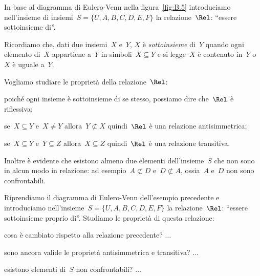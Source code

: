 \begin{exrig}
 \begin{esempio}

In base al diagramma di Eulero-Venn nella figura~\ref{fig:B.5} introduciamo 
nell'insieme di insiemi~$S = \lbrace U, A, B, C, D, E, F \rbrace$ la 
relazione~$\Rel$: ``essere sottoinsieme di''.

Ricordiamo che, dati due insiemi~$X$ e~$Y$, $X$ è \emph{sottoinsieme} di~$Y$ 
quando ogni elemento di~$X$ appartiene a~$Y$ in simboli~$X \subseteq Y$ e
si legge~$X$ è contenuto in~$Y$ o~$X$ è uguale a~$Y$.

Vogliamo studiare le proprietà della relazione~$\Rel$:

\begin{enumeratea}
\item poiché ogni insieme è sottoinsieme di se stesso, possiamo dire che~$\Rel$ 
è riflessiva;
\item se~$X \subseteq Y$ e~$X \neq Y$ allora~$Y \not\subset X$ quindi~$\Rel$ è 
una relazione antisimmetrica;
\item se~$X \subseteq Y$ e~$Y \subseteq Z$ allora~$X \subseteq Z$ quindi~$\Rel$ 
è una relazione transitiva.
\end{enumeratea}

Inoltre è evidente che esistono almeno due elementi dell'insieme~$S$ che non 
sono in
alcun modo in relazione: ad esempio~$A \not\subset D$ e~$D \not\subset A$, 
ossia~$A$ e~$D$ non sono confrontabili.

 \end{esempio}

 \begin{esempio}

Riprendiamo il diagramma di Eulero-Venn dell'esempio precedente e introduciamo 
nell'insieme~$S = \lbrace U, A, B, C, D, E, F \rbrace$ la relazione~$\Rel$:
``essere sottoinsieme proprio di''. Studiamo le proprietà di questa relazione:
\begin{itemize*}
 \item cosa è cambiato rispetto alla relazione precedente? $\ldots$
 \item sono ancora valide le proprietà antisimmetrica e transitiva? $\ldots$
 \item esistono elementi di~$S$ non confrontabili? $\ldots$
\end{itemize*}

 \end{esempio}
\end{exrig}

